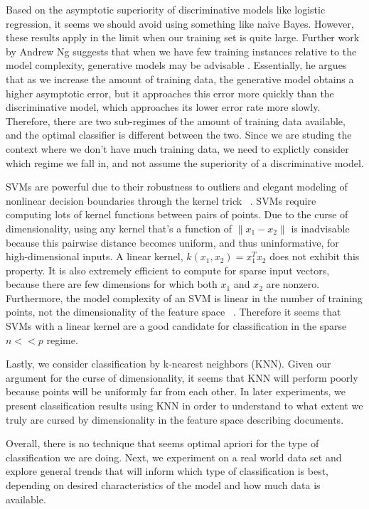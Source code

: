 \documentclass[]{article}
\begin{document}
	Based on the asymptotic superiority of discriminative models like logistic regression, it seems we should avoid using something like naive Bayes. However, these results apply in the limit when our training set is quite large.  Further work by Andrew Ng suggests that when we have few training instances relative to the model complexity, generative models may be advisable \cite{jordan2002discriminative}. Essentially, he argues that as we increase the amount of training data, the generative model obtains a higher asymptotic error, but it approaches this error more quickly than the discriminative model, which approaches its lower error rate more slowly. Therefore, there are two sub-regimes of the amount of training data available, and  the optimal classifier is different  between the two. Since we are studing the context where we don't have much training data, we need to explictly consider which regime we fall in, and not assume the superiority of a discriminative model.
	
	SVMs are powerful due to their robustness to outliers and elegant modeling of nonlinear decision boundaries through the kernel trick ~\cite{LectureSVM}. SVMs require computing lots of kernel functions between pairs of points. Due to the curse of dimensionality, using any kernel that's a function of $\lVert x_1 - x_2 \rVert$ is inadvisable because this pairwise distance becomes uniform, and thus uninformative, for high-dimensional inputs. A linear kernel, $k(x_1,x_2) = x_1^Tx_2$ does not exhibit this property. It is also extremely efficient to compute for sparse input vectors, because there are few dimensions for which both $x_1$ and $x_2$ are nonzero. Furthermore, the model complexity of an SVM is linear in the number of training points, not the dimensionality of the feature space ~\cite{LectureSVM}. Therefore it seems that SVMs with a linear kernel are a good candidate for classification in the sparse $n << p$ regime. 

	Lastly, we consider classification by k-nearest neighbors (KNN). Given our argument for the curse of dimensionality, it seems that KNN will perform poorly because points will be uniformly far from each other. In later experiments, we present classification results using KNN in order to understand to what extent we truly are cursed by dimensionality in the feature space describing documents. 

Overall, there is no technique that seems optimal apriori for the type of classification we are doing. Next, we experiment on a real world data set and explore general trends that will inform which type of classification is best, depending on desired characteristics of the model and how much data is available. 
\end{document}
